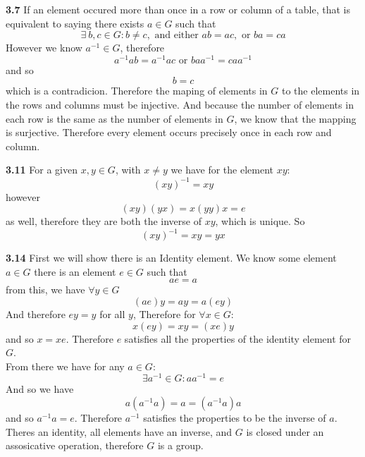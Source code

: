 \documentclass[12pt]{article}
\newenvironment{ques}{\vspace{2 ex}}{\vspace{2 ex}}
\theoremstyle{definition}
\begin{document}
\begin{ques}
	\textbf{3.7}
		If an element occured more than once in a row or column of a
		table, that is equivalent to saying there exists $a \in G$ such
		that
		$$\exists \ b, c \in G: b \neq c, \text{ and either } ab = ac, \text{ or } ba = ca$$
		However we know $a^{-1} \in G$, therefore
		$$a^{-1} ab = a^{-1} a c \text{ or } baa^{-1} = caa^{-1}$$
		and so 
		$$b = c$$
		which is a contradicion. Therefore the maping of elements in
		$G$ to the elements in the rows and columns must be injective.
		And because the number of elements in each row is the same as
		the number of elements in $G$, we know that the mapping is
		surjective. Therefore every element occurs precisely once in
		each row and column.
\end{ques}

\begin{ques}
	\textbf{3.11}
		For a given $x,y \in G$, with $x \neq y$ we have for the element $xy$:
		$$(xy)^{-1} = xy$$
		however 
		$$(xy)(yx) = x(yy)x = e$$
		as well, therefore they are both the inverse of $xy$, which is unique. So
		$$(xy)^{-1} = xy = yx$$
\end{ques}

\begin{ques}
	\textbf{3.14}
		First we will show there is an Identity element. We know some
		element $a \in G$ there is an element $e \in G$ such that 
		$$ae = a$$
		from this, we have $\forall y \in G$
		$$(ae)y = ay = a(ey)$$
		And therefore $ey = y$ for all $y$, Therefore for $\forall x \in G$:
		$$x(ey) = xy = (xe)y$$
		and so $x = xe$. Therefore $e$ satisfies all the properties of
		the identity element for $G$.\\
		From there we have for any $a \in G$:
		$$\exists a^{-1} \in G: a a^{-1} = e$$
		And so we have
		$$a(a^{-1}a) = a = (a^{-1}a)a$$
		and so $a^{-1}a = e$. Therefore $a^{-1}$ satisfies the
		properties to be the inverse of $a$.\\
		Theres an identity, all elements have an inverse, and $G$ is
		closed under an assosicative operation, therefore $G$ is a
		group.
\end{ques}
\end{document}
